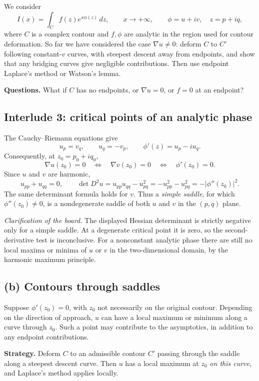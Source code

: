 \documentclass[11pt,a4paper]{article}
\begin{document}
We consider
\[
    I(x)=\int_C f(z)e^{x\phi(z)}\,dz,
    \qquad x\to+\infty,
    \qquad \phi=u+iv,\quad z=p+iq,
\]
where $C$ is a complex contour and $f,\phi$ are analytic in the region
used for contour deformation.
So far we have considered the case $\nabla u\neq0$: deform $C$ to $C'$
following constant-$v$ curves, with steepest descent away from endpoints,
and show that any bridging curves give negligible contributions.
Then use endpoint Laplace's method or Watson's lemma.

\medskip
\noindent\textbf{Questions.}
What if $C$ has no endpoints, or $\nabla u=0$, or $f=0$ at an endpoint?

\subsection*{Interlude 3: critical points of an analytic phase}
The Cauchy--Riemann equations give
\[
    u_p=v_q,\qquad u_q=-v_p,
    \qquad \phi'(z)=u_p-iu_q.
\]
Consequently, at $z_0=p_0+iq_0$,
\[
    \nabla u(z_0)=0
    \quad\Longleftrightarrow\quad
    \nabla v(z_0)=0
    \quad\Longleftrightarrow\quad
    \phi'(z_0)=0.
\]
Since $u$ and $v$ are harmonic,
\[
    u_{pp}+u_{qq}=0,\qquad
    \det D^2u=u_{pp}u_{qq}-u_{pq}^2
    =-u_{pp}^2-u_{pq}^2=-|\phi''(z_0)|^2.
\]
The same determinant formula holds for $v$. Thus a
\emph{simple saddle}, for which $\phi''(z_0)\neq0$, is a nondegenerate
saddle of both $u$ and $v$ in the $(p,q)$ plane.

\medskip
\noindent\textit{Clarification of the board.}
The displayed Hessian determinant is strictly negative only for a
simple saddle. At a degenerate critical point it is zero, so the
second-derivative test is inconclusive. For a nonconstant analytic
phase there are still no local maxima or minima of $u$ or $v$ in the
two-dimensional domain, by the harmonic maximum principle.

\subsection*{(b) Contours through saddles}
Suppose $\phi'(z_0)=0$, with $z_0$ not necessarily on the original contour.
Depending on the direction of approach, $u$ can have a local maximum
or minimum along a curve through $z_0$. Such a point may contribute
to the asymptotics, in addition to any endpoint contributions.

\medskip
\noindent\textbf{Strategy.}
Deform $C$ to an admissible contour $C'$ passing through the saddle
along a steepest descent curve. Then $u$ has a local maximum at $z_0$
\emph{on this curve}, and Laplace's method applies locally.
\end{document}
